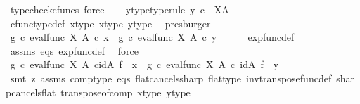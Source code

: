 \begin{isabellebody}
\ {\isacharparenleft}{\kern0pt}typecheck{\isacharunderscore}{\kern0pt}cfuncs{\isacharcomma}{\kern0pt}\ force{\isacharparenright}{\kern0pt}\isanewline
\ \ \isamarkupfalse%
\ y{\isacharunderscore}{\kern0pt}type{\isacharprime}{\kern0pt}{\isacharbrackleft}{\kern0pt}type{\isacharunderscore}{\kern0pt}rule{\isacharbrackright}{\kern0pt}{\isacharcolon}{\kern0pt}\ {\isachardoublequoteopen}y\ {\isasymin}\isactrlsub c\ \ X\isactrlbsup A\isactrlesup {\isachardoublequoteclose}\isanewline
\ \ \ \ \isamarkupfalse%
\ cfunc{\isacharunderscore}{\kern0pt}type{\isacharunderscore}{\kern0pt}def\ x{\isacharunderscore}{\kern0pt}type\ x{\isacharunderscore}{\kern0pt}type{\isacharprime}{\kern0pt}\ y{\isacharunderscore}{\kern0pt}type\ \isamarkupfalse%
\ presburger\ \ \isanewline
\ \ \isamarkupfalse%
\ {\isachardoublequoteopen}{\isacharparenleft}{\kern0pt}g\ {\isasymcirc}\isactrlsub c\ eval{\isacharunderscore}{\kern0pt}func\ X\ A{\isacharparenright}{\kern0pt}\isactrlsup {\isasymsharp}\ {\isasymcirc}\isactrlsub c\ x\ {\isacharequal}{\kern0pt}\ {\isacharparenleft}{\kern0pt}g\ {\isasymcirc}\isactrlsub c\ eval{\isacharunderscore}{\kern0pt}func\ X\ A{\isacharparenright}{\kern0pt}\isactrlsup {\isasymsharp}\ {\isasymcirc}\isactrlsub c\ y{\isachardoublequoteclose}\isanewline
\ \ \ \ \isamarkupfalse%
\ exp{\isacharunderscore}{\kern0pt}func{\isacharunderscore}{\kern0pt}def\ \isamarkupfalse%
\ assms\ eqs\ exp{\isacharunderscore}{\kern0pt}func{\isacharunderscore}{\kern0pt}def{}\ \isamarkupfalse%
\ force\ \isanewline
\ \ \isamarkupfalse%
\ \isamarkupfalse%
\ {\isachardoublequoteopen}g\ {\isasymcirc}\isactrlsub c\ {\isacharparenleft}{\kern0pt}eval{\isacharunderscore}{\kern0pt}func\ X\ A\ {\isasymcirc}\isactrlsub c{\isacharparenleft}{\kern0pt}id{\isacharparenleft}{\kern0pt}A{\isacharparenright}{\kern0pt}\ {\isasymtimes}\isactrlsub f\ \ x{\isacharparenright}{\kern0pt}{\isacharparenright}{\kern0pt}\ {\isacharequal}{\kern0pt}\ g\ {\isasymcirc}\isactrlsub c\ {\isacharparenleft}{\kern0pt}eval{\isacharunderscore}{\kern0pt}func\ X\ A\ {\isasymcirc}\isactrlsub c\ {\isacharparenleft}{\kern0pt}id{\isacharparenleft}{\kern0pt}A{\isacharparenright}{\kern0pt}\ {\isasymtimes}\isactrlsub f\ \ y{\isacharparenright}{\kern0pt}{\isacharparenright}{\kern0pt}{\isachardoublequoteclose}\isanewline
\ \ \ \ \isamarkupfalse%
\ {\isacharparenleft}{\kern0pt}smt\ {\isacharparenleft}{\kern0pt}z{}{\isacharparenright}{\kern0pt}\ assms{\isacharparenleft}{\kern0pt}{}{\isacharparenright}{\kern0pt}\ comp{\isacharunderscore}{\kern0pt}type\ eqs\ flat{\isacharunderscore}{\kern0pt}cancels{\isacharunderscore}{\kern0pt}sharp\ flat{\isacharunderscore}{\kern0pt}type\ inv{\isacharunderscore}{\kern0pt}transpose{\isacharunderscore}{\kern0pt}func{\isacharunderscore}{\kern0pt}def{}\ sharp{\isacharunderscore}{\kern0pt}cancels{\isacharunderscore}{\kern0pt}flat\ transpose{\isacharunderscore}{\kern0pt}of{\isacharunderscore}{\kern0pt}comp\ x{\isacharunderscore}{\kern0pt}type{\isacharprime}{\kern0pt}\ y{\isacharunderscore}{\kern0pt}type{\isacharprime}{\kern0pt}{\isacharparenright}{\kern0pt}\isanewline

\end{isabellebody}
